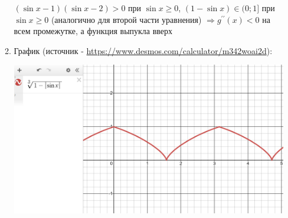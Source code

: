 \begin{enumerate}
\begin{enumerate}
        $(\sin{x} - 1)(\sin{x} - 2) > 0$ при $\sin{x} \geq 0$, $(1 - \sin{x}) \in (0;1]$ при $\sin{x} \geq 0$ (аналогично для второй части уравнения)
        $\Longrightarrow g^{\prime\prime}(x) < 0$ на всем промежутке, а функция выпукла вверх

        \item График (источник - \url{https://www.desmos.com/calculator/m342woai2d}):

        \includegraphics[width=14cm]{images/1b1}

    \end{enumerate}
\end{enumerate}

\clearpage
